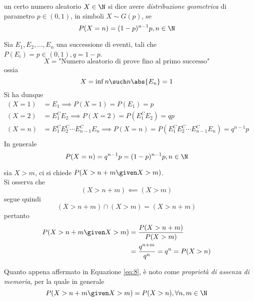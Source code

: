 \documentclass{subfiles}
\begin{document}
\begin{Definition*}
    un certo numero aleatorio \(X \in \N\) si dice avere \emph{distribuzione geometrica} di parametro \(p \in (0, 1)\), in simboli \(X \sim G(p)\), se
    \[
        P(X = n) = (1 - p)^{n - 1} p, n \in \N
    \]
\end{Definition*}
\noindent
Sia \(E_{1},E_{2},\dots, E_{n}\) una successione di eventi, tali che \(P(E_{i}) = p \in (0, 1), q = 1 - p\).
\[
    X = \text{"Numero aleatorio di prove fino al primo successo"}
\]
ossia
\[
    X = \inf{n \such n \abs{E_{n}} = 1}
\]
Si ha dunque
\[\begin{aligned}
        (X = 1) & = E_{1} \implies P(X = 1) = P(E_{1}) = p                                                                                     \\
        (X = 2) & = E_{1}^{C}E_{2} \implies P(X = 2) = P(E_{1}^{C}E_{2}) = qp                                                                  \\
        (X = n) & = E_{1}^{C}E_{2}^{C}\cdots E_{n-1}^{C} E_{n} \implies P(X = n) = P(E_{1}^{C}E_{2}^{C}\cdots E_{n-1}^{C} E_{n}) = q^{n - 1} p \\
    \end{aligned}\]
In generale
\[
    P(X = n) = q^{n - 1}p = (1 - p)^{n - 1}p, n \in \N
\]
\begin{Example*}
    sia \(X > m\), ci si chiede \(P(X > n + m \given X > m)\).
    \\
    Si osserva che
    \[
        (X > n + m) \impliedby (X > m)
    \]
    segue quindi
    \[
        (X > n + m) \cap (X > m) = (X > n + m)
    \]
    pertanto
    \begin{equation}
        \begin{aligned}
            P(X > n + m \given X > m) & = \frac{P(X > n + m)}{P(X > m)}              \\
                                      & = \frac{q^{n + m}}{q^{n}} = q^{n} = P(X > n)
        \end{aligned}
    \end{equation}
\end{Example*}
\noindent
Quanto appena affermato in Equazione \eqref{eq:8}, è noto come \emph{proprietà di assenza di memoria}, per la quale in generale
\[
    P(X > n + m \given X > m) = P(X > n), \forall n, m \in \N
\]
\clearpage
\end{document}
